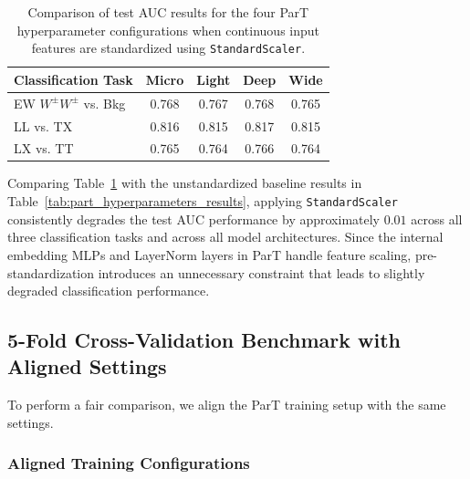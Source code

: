 \documentclass[12pt]{article}
\begin{document}
		\begin{table}[htbp]
			\centering
			\caption{Comparison of test AUC results for the four ParT hyperparameter configurations when continuous input features are standardized using \texttt{StandardScaler}.}
			\label{tab:part_standardized_input_results}
			\begin{tabular}{l|cccc}
				\hline
				\hline
				Classification Task      & Micro & Light & Deep  & Wide  \\ \hline
				EW $W^\pm W^\pm$ vs. Bkg & 0.768 & 0.767 & 0.768 & 0.765 \\
				LL vs. TX                & 0.816 & 0.815 & 0.817 & 0.815 \\
				LX vs. TT                & 0.765 & 0.764 & 0.766 & 0.764 \\
				\hline
				\hline
			\end{tabular}
		\end{table}

		Comparing Table~\ref{tab:part_standardized_input_results} with the unstandardized baseline results in Table~\ref{tab:part_hyperparameters_results}, applying \texttt{StandardScaler} consistently degrades the test AUC performance by approximately $0.01$ across all three classification tasks and across all model architectures. Since the internal embedding MLPs and LayerNorm layers in ParT handle feature scaling, pre-standardization introduces an unnecessary constraint that leads to slightly degraded classification performance.


	\subsection{5-Fold Cross-Validation Benchmark with Aligned Settings}%
	\label{sub:5_fold_cross_validation_benchmark_with_aligned_settings}

		To perform a fair comparison, we align the ParT training setup with the same settings.

		\subsubsection{Aligned Training Configurations}
\end{document}
